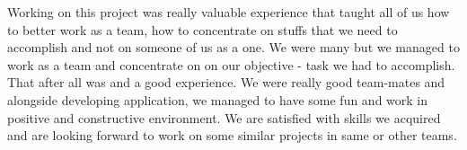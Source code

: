 		Working on this project was really valuable experience that taught all of us how to better work as a team, how to concentrate on stuffs that we need to accomplish and not on someone of us as a one. We were many but we managed to work as a team and concentrate on on our objective - task we had to accomplish. That after all was and a good experience. We were really good team-mates and alongside developing application, we managed to have some fun and work in positive and constructive environment. We are satisfied with skills we acquired and are looking forward to work on some similar projects in same or other teams.
		
		\eject 